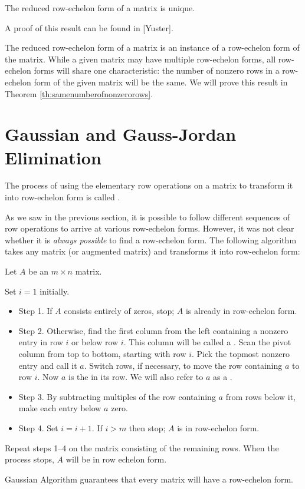 \documentclass{ximera}
\begin{document}
\begin{theorem}\label{th:uniquenessofrref} The reduced row-echelon form of a matrix is unique.
\end{theorem}
A proof of this result can be found in [Yuster]. 

The reduced row-echelon form of a matrix is an instance of a row-echelon form of the matrix.  While a given matrix may have multiple row-echelon forms, all row-echelon forms will share one characteristic: the number of nonzero rows in a row-echelon form of the given matrix will be the same.
We will prove this result in Theorem \ref{th:samenumberofnonzerorows}.

\section*{Gaussian and Gauss-Jordan Elimination}

\begin{definition}\label{def:GaussianElimination}
The process of using the elementary row operations on a matrix to transform it into row-echelon form is called .
\end{definition}

As we saw in the previous section, it is possible to follow different sequences of row operations to arrive at various row-echelon forms.  However, it was not clear whether it is {\it always possible} to find a row-echelon form.  The following algorithm takes any matrix (or augmented matrix) and transforms it into row-echelon form:
\begin{algorithm} \label{alg:gaussian} 
Let $A$ be an $m\times n$ matrix.

Set $i=1$ initially.
\begin{itemize}
\item[] Step 1. If $A$ consists entirely of zeros, stop;  $A$ is already in row-echelon form.

\item[] Step 2. Otherwise, find the first column from the left containing a nonzero entry in row $i$ or below row $i$.  This column will be called a .  Scan the pivot column from top to bottom, starting with row $i$.  Pick the topmost nonzero entry and call it $a$.  Switch rows, if necessary, to move the row containing $a$ to row $i$.  Now $a$ is the  in its row.  We will also refer to $a$ as a .  

\item[] Step 3. By subtracting multiples of the row containing $a$ from rows below it, make each entry below $a$ zero.

\item[] Step 4.  Set $i=i+1$.  If $i>m$ then stop; $A$ is in row-echelon form.

\end{itemize}

Repeat steps 1--4 on the matrix consisting of the remaining rows.
When the process stops, $A$ will be in row echelon form.
\end{algorithm}
Gaussian Algorithm guarantees that every matrix will have a row-echelon form.  
\end{document}
